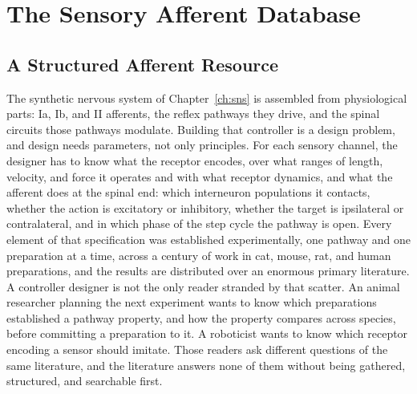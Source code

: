 \chapter{The Sensory Afferent Database}\label{ch:database}
\graphicspath{{D:/Github/Bipedal_Robot/Documentation/Reports and Papers/Dissertation/Figures/50-database/}{figs/50-database/}}

\section{A Structured Afferent Resource}\label{sec:sadb_resource}

The synthetic nervous system of Chapter~\ref{ch:sns} is assembled from physiological parts: Ia, Ib, and II afferents, the reflex pathways they drive, and the spinal circuits those pathways modulate. Building that controller is a design problem, and design needs parameters, not only principles. For each sensory channel, the designer has to know what the receptor encodes, over what ranges of length, velocity, and force it operates and with what receptor dynamics, and what the afferent does at the spinal end: which interneuron populations it contacts, whether the action is excitatory or inhibitory, whether the target is ipsilateral or contralateral, and in which phase of the step cycle the pathway is open. Every element of that specification was established experimentally, one pathway and one preparation at a time, across a century of work in cat, mouse, rat, and human preparations, and the results are distributed over an enormous primary literature. A controller designer is not the only reader stranded by that scatter. An animal researcher planning the next experiment wants to know which preparations established a pathway property, and how the property compares across species, before committing a preparation to it. A roboticist wants to know which receptor encoding a sensor should imitate. Those readers ask different questions of the same literature, and the literature answers none of them without being gathered, structured, and searchable first.

